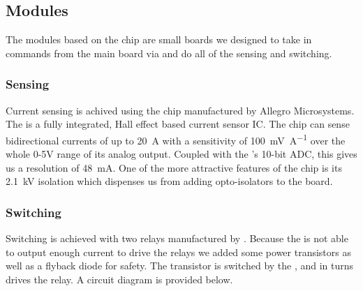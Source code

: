 \subsection{\atmel Modules}
The modules based on the \atmega chip are small boards we designed to take in commands from the main \olimex board via \rsserial and do all of the sensing and switching.

\subsubsection{Sensing}
Current sensing is achived using the \allegro chip manufactured by Allegro Microsystems. The \allegro is a fully integrated, Hall effect based current sensor IC. The chip can sense bidirectional currents of up to \SI{20}{\ampere} with a sensitivity of \SI{100}{\milli\volt\per\ampere} over the whole 0-5V range of its analog output. Coupled with the \atmega 's 10-bit ADC, this gives us a resolution of \SI{48}{\milli\ampere}. One of the more attractive features of the \allegro chip is its \SI{2.1}{\kilo\volt} isolation which dispenses us from adding opto-isolators to the board.\\

\subsubsection{Switching}
Switching is achieved with two \relay relays manufactured by \relaymf. Because the \atmega is not able to output enough current to drive the relays we added some power transistors as well as a flyback diode for safety. The transistor is switched by the \atmega , and in turns drives the relay. A circuit diagram is provided below.


